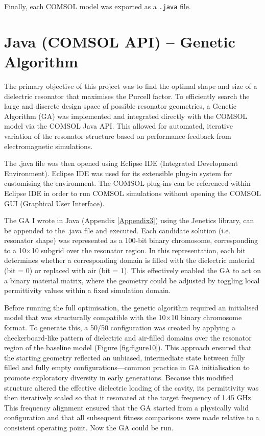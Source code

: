 Finally, each COMSOL model was exported as a \texttt{.java} file.

\section{Java (COMSOL API) – Genetic Algorithm}
\label{sec:section12}
The primary objective of this project was to find the optimal shape and size of
a dielectric resonator that maximises the Purcell factor. To efficiently search
the large and discrete design space of possible resonator geometries, a Genetic
Algorithm (GA) was implemented and integrated directly with the COMSOL model via
the COMSOL Java API. This allowed for automated, iterative variation of the
resonator structure based on performance feedback from electromagnetic
simulations.

The .java file was then opened using Eclipse IDE (Integrated Development
Environment). Eclipse IDE was used for its extensible plug-in system for
customising the environment. The COMSOL plug-ins can be referenced within
Eclipse IDE in order to run COMSOL simulations without opening the COMSOL GUI
(Graphical User Interface).

The GA I wrote in Java (Appendix \ref{Appendix3}) using the Jenetics
library\autocite{wilhelmsen_jenetics}, can be appended to the .java file and
executed. Each candidate solution (i.e. resonator shape) was represented as a
100-bit binary chromosome, corresponding to a 10×10 subgrid over the resonator
region. In this representation, each bit determines whether a corresponding
domain is filled with the dielectric material (bit = 0) or replaced with air
(bit = 1). This effectively enabled the GA to act on a binary material matrix,
where the geometry could be adjusted by toggling local permittivity values
within a fixed simulation domain.

Before running the full optimisation, the genetic algorithm required an
initialised model that was structurally compatible with the 10×10 binary
chromosome format. To generate this, a 50/50 configuration was created by
applying a checkerboard-like pattern of dielectric and air-filled domains over
the resonator region of the baseline model (Figure \ref{fig:figure10}). This
approach ensured that the starting geometry reflected an unbiased, intermediate
state between fully filled and fully empty configurations—common practice in GA
initialisation to promote exploratory diversity in early generations. Because
this modified structure altered the effective dielectric loading of the cavity,
its permittivity was then iteratively scaled so that it resonated at the target
frequency of 1.45 GHz. This frequency alignment ensured that the GA started from
a physically valid configuration and that all subsequent fitness comparisons
were made relative to a consistent operating point. Now the GA could be run.

